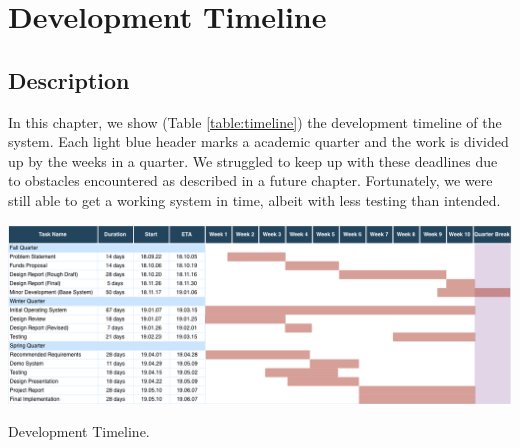 \chapter{Development Timeline}

\section{Description}
In this chapter, we show (Table \ref{table:timeline}) the development timeline of the system. Each light blue header marks a academic quarter and the work is divided up by the weeks in a quarter. We struggled to keep up with these deadlines due to obstacles encountered as described in a future chapter. Fortunately, we were still able to get a working system in time, albeit with less testing than intended.

\begin{table}[h]
  \includegraphics[width=\linewidth]{DevelopmentTimeline.png}
  \caption{Development Timeline.}
  \label{table:timeline}
\end{table}
